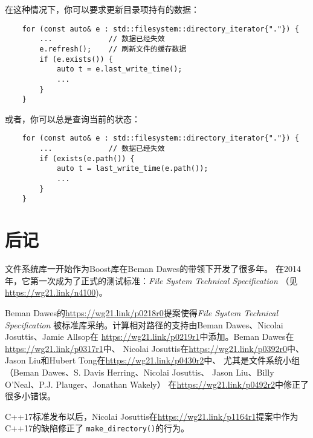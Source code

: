 在这种情况下，你可以要求更新目录项持有的数据：
\begin{lstlisting}
    for (const auto& e : std::filesystem::directory_iterator{"."}) {
        ...             // 数据已经失效
        e.refresh();    // 刷新文件的缓存数据
        if (e.exists()) {
            auto t = e.last_write_time();
            ...
        }
    }
\end{lstlisting}
或者，你可以总是查询当前的状态：
\begin{lstlisting}
    for (const auto& e : std::filesystem::directory_iterator{"."}) {
        ...             // 数据已经失效
        if (exists(e.path()) {
            auto t = last_write_time(e.path());
            ...
        }
    }
\end{lstlisting}


\section{后记}
文件系统库一开始作为Boost库在Beman Dawes的带领下开发了很多年。
在2014年，它第一次成为了正式的测试标准：\emph{File System Technical Specification}
（见\url{https://wg21.link/n4100})。

Beman Dawes的\url{https://wg21.link/p0218r0}提案使得\emph{File System Technical Specification}
被标准库采纳。计算相对路径的支持由Beman Dawes、Nicolai Josuttis、Jamie Allsop在
\url{https://wg21.link/p0219r1}中添加。Beman Dawes在\url{https://wg21.link/p0317r1}中、
Nicolai Josuttis在\url{https://wg21.link/p0392r0}中、Jason Liu和Hubert Tong在\url{https://wg21.link/p0430r2}中、
尤其是文件系统小组
（Beman Dawes、S. Davis Herring、Nicolai Josuttis、 Jason Liu、Billy O’Neal、P.J. Plauger、Jonathan Wakely）
在\url{https://wg21.link/p0492r2}中修正了很多小错误。

C++17标准发布以后，Nicolai Josuttis在\url{https://wg21.link/p1164r1}提案中作为C++17的缺陷修正了
\texttt{make\_directory()}的行为。
